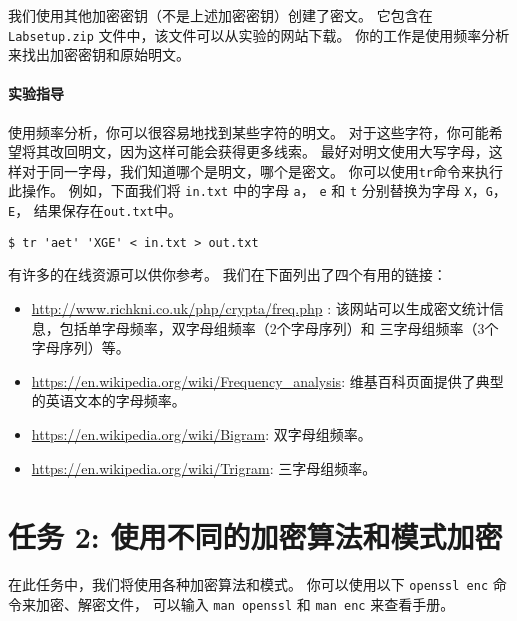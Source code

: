 我们使用其他加密密钥（不是上述加密密钥）创建了密文。
它包含在 \texttt{Labsetup.zip} 文件中，该文件可以从实验的网站下载。
你的工作是使用频率分析来找出加密密钥和原始明文。


\paragraph{实验指导}
使用频率分析，你可以很容易地找到某些字符的明文。
对于这些字符，你可能希望将其改回明文，因为这样可能会获得更多线索。
最好对明文使用大写字母，这样对于同一字母，我们知道哪个是明文，哪个是密文。
你可以使用\texttt{tr}命令来执行此操作。
例如，下面我们将 \texttt{in.txt} 中的字母 \texttt{a}， \texttt{e} 和 \texttt{t}
分别替换为字母 \texttt{X}，\texttt{G}，\texttt{E}， 结果保存在\texttt{out.txt}中。


\begin{lstlisting}
$ tr 'aet' 'XGE' < in.txt > out.txt
\end{lstlisting}


有许多的在线资源可以供你参考。
我们在下面列出了四个有用的链接：


\begin{itemize}
  \item \url{http://www.richkni.co.uk/php/crypta/freq.php} :
        该网站可以生成密文统计信息，包括单字母频率，双字母组频率（2个字母序列）和
        三字母组频率（3个字母序列）等。

  \item \url{https://en.wikipedia.org/wiki/Frequency_analysis}:
        维基百科页面提供了典型的英语文本的字母频率。

  \item \url{https://en.wikipedia.org/wiki/Bigram}:
        双字母组频率。

  \item \url{https://en.wikipedia.org/wiki/Trigram}:
        三字母组频率。
\end{itemize}




\section{任务 2: 使用不同的加密算法和模式加密}

在此任务中，我们将使用各种加密算法和模式。
你可以使用以下 {\tt openssl enc} 命令来加密、解密文件，
可以输入 {\tt man openssl} 和 {\tt man enc} 来查看手册。

